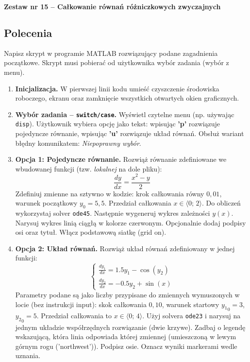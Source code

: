 \documentclass[a4paper,11pt]{article}
\begin{document}
\clearpage
\begin{center}
  {\large\bfseries Zestaw nr 15 \quad -- \quad Całkowanie równań różniczkowych zwyczajnych}
\end{center}
\hrulefill
\vspace{0.4cm}

\subsection*{Polecenia}

Napisz skrypt w programie MATLAB rozwiązujący podane zagadnienia początkowe. Skrypt musi pobierać od użytkownika wybór zadania (wybór z menu).

\begin{enumerate}[leftmargin=*, label=\textbf{\arabic*.}, itemsep=2pt]

  \item \textbf{Inicjalizacja.}
    W pierwszej linii kodu umieść czyszczenie środowiska roboczego, ekranu oraz zamknięcie wszystkich otwartych okien graficznych.

  \item \textbf{Wybór zadania -- \texttt{switch/case}.}
    Wyświetl czytelne menu (np. używając \texttt{disp}). Użytkownik wybiera opcję jako tekst: wpisując \textbf{'p'} rozwiązuje pojedyncze równanie, wpisując \textbf{'u'} rozwiązuje układ równań. Obsłuż wariant błędny komunikatem: \textit{Niepoprawny wybór}.

  \item \textbf{Opcja 1: Pojedyncze równanie.}
    Rozwiąż równanie zdefiniowane we wbudowanej funkcji (tzw. \textit{lokalnej} na dole pliku):
    \[ \frac{dy}{dx} = \frac{x^2 - y}{2} \]
    Zdefiniuj zmienne na sztywno w kodzie: krok całkowania równy $0{,}01$, warunek początkowy $y_0 = 5{,}5$. Przedział całkowania $x \in \langle 0;\,2 \rangle$.
    Do obliczeń wykorzystaj solver \texttt{ode45}. Następnie wygeneruj wykres zależności $y(x)$. Narysuj wykres linią ciągłą w kolorze czerwonym. Opcjonalnie dodaj podpisy osi oraz tytuł. Włącz podstawową siatkę (grid on).

  \item \textbf{Opcja 2: Układ równań.}
    Rozwiąż układ równań zdefiniowany w jednej funkcji:\\[-0.5em]
    \[
    \begin{cases}
      \frac{dy_1}{dx} = 1.5y_1 - \cos(y_2) \\
      \frac{dy_2}{dx} = -0.5y_2 + \sin(x)
    \end{cases}
    \]
    Parametry podane są jako liczby przypisane do zmiennych wymuszonych w locie (bez instrukcji input): skok całkowania $0{,}10$, warunek startowy $ {y_1}_{0} = 3 $, $ {y_2}_{0} = 5 $. Przedział całkowania to $x \in \langle 0;\,4 \rangle$.
    Użyj solvera \texttt{ode23} i narysuj na jednym układzie współrzędnych rozwiązanie (dwie krzywe). Zadbaj o legendę wskazującą, która linia odpowiada której zmiennej (umieszczoną w lewym górnym rogu ('northwest')). Podpisz osie. Oznacz wyniki markerami wedle uznania.

\end{enumerate}
\end{document}
